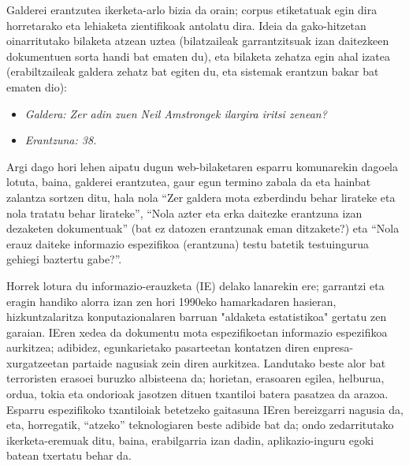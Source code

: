 \begin{multicols}{2}
Galderei erantzutea ikerketa-arlo bizia da orain; corpus etiketatuak egin dira horretarako eta lehiaketa zientifikoak antolatu dira. Ideia da gako-hitzetan oinarritutako bilaketa atzean uztea (bilatzaileak garrantzitsuak izan daitezkeen dokumentuen sorta handi bat ematen du), eta bilaketa zehatza egin ahal izatea (erabiltzaileak galdera zehatz bat egiten du, eta sistemak erantzun bakar bat ematen dio):

\begin{itemize}
\item[] \textit{Galdera: Zer adin zuen Neil Amstrongek ilargira iritsi zenean?}
\item[] \textit{Erantzuna: 38.}
\end{itemize}

Argi dago hori lehen aipatu dugun web-bilaketaren esparru komunarekin dagoela lotuta, baina, galderei erantzutea, gaur egun termino zabala da eta hainbat zalantza sortzen ditu, hala nola “Zer galdera mota ezberdindu behar lirateke eta nola tratatu behar lirateke”, “Nola azter eta erka daitezke erantzuna izan dezaketen dokumentuak” (bat ez datozen erantzunak eman ditzakete?) eta “Nola erauz daiteke informazio espezifikoa (erantzuna) testu batetik testuingurua gehiegi baztertu gabe?”. 

Horrek lotura du informazio-erauzketa (IE) delako lanarekin ere; garrantzi eta eragin handiko alorra izan zen hori 1990eko hamarkadaren hasieran, hizkuntzalaritza konputazionalaren barruan "aldaketa estatistikoa" gertatu zen garaian. IEren xedea da dokumentu mota espezifikoetan informazio espezifikoa aurkitzea; adibidez, egunkarietako pasarteetan kontatzen diren enpresa-xurgatzeetan partaide nagusiak zein diren aurkitzea. Landutako beste alor bat terroristen erasoei buruzko albisteena da; horietan, erasoaren egilea, helburua, ordua, tokia eta ondorioak jasotzen dituen txantiloi batera pasatzea da arazoa. Esparru espezifikoko txantiloiak betetzeko gaitasuna IEren bereizgarri nagusia da, eta, horregatik, “atzeko” teknologiaren beste adibide bat da; ondo zedarritutako ikerketa-eremuak ditu, baina, erabilgarria izan dadin, aplikazio-inguru egoki batean txertatu behar da. 



\end{multicols}
